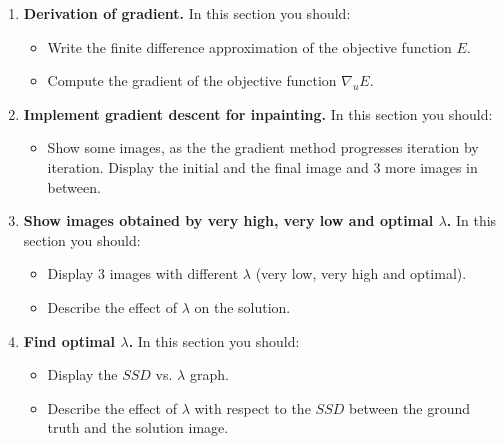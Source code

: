 \documentclass{paper}
\begin{document}
\begin{enumerate}
\item \textbf{Derivation of gradient.} In this section you should:

\begin{itemize}
\item Write the finite difference approximation of the objective function $E$.
\item Compute the gradient of the objective function $\nabla_uE$.  
\end{itemize}


\item \textbf{Implement gradient descent for inpainting.} In this section you should:

\begin{itemize}
\item Show some images, as the the gradient method progresses iteration by iteration. Display the initial and the final image and 3 more images in between.
\end{itemize}

\item \textbf{Show images obtained by very high, very low and optimal $\lambda$.} In this section you should:

\begin{itemize}
\item Display 3 images with different $\lambda$ (very low, very high and optimal).
\item Describe the effect of $\lambda$ on the solution.
\end{itemize}

\item \textbf{ Find optimal $\lambda$.} In this section you should:

\begin{itemize}
\item Display the $SSD$ vs. $\lambda$ graph.
\item Describe the effect of $\lambda$ with respect to the $SSD$ between the ground truth and the solution image.
\end{itemize}
\end{enumerate}


 
\end{document}
